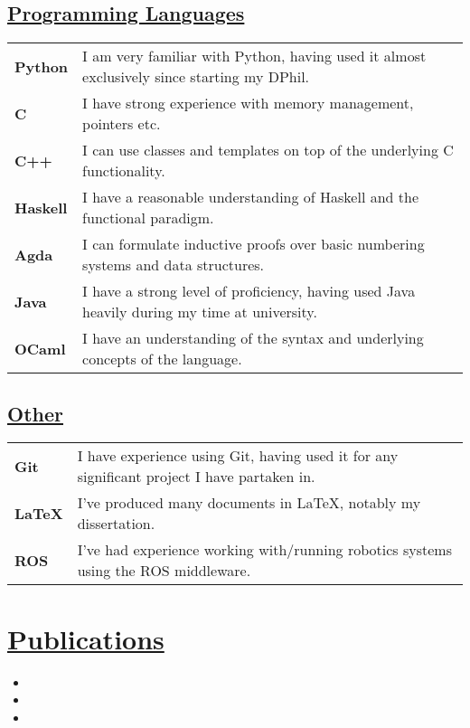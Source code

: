 \documentclass[11pt]{article}
\begin{document}
		\subsection*{\underline{Programming Languages}}
		\renewcommand{\arraystretch}{1.3}%
		\begin{tabular}[20pt]{ll}
		        \textbf{Python} & I am very familiar with Python, having used it almost exclusively since starting my DPhil. \\
			\textbf{C} & I have strong experience with memory management, pointers etc. \\
			\textbf{C++} & I can use classes and templates on top of the underlying C functionality. \\
			\textbf{Haskell} & I have a reasonable understanding of Haskell and the functional paradigm.\\
			\textbf{Agda} & I can formulate inductive proofs over basic numbering systems and data structures.\\
			 \textbf{Java} &  I have a strong level of proficiency, having used Java heavily during my time at university.\\
			 \textbf{OCaml} & I have an understanding of the syntax and underlying concepts of the language.\\
		\end{tabular} 
		\subsection*{\underline{Other}}
		\renewcommand{\arraystretch}{1.3}%
		\begin{tabular}{ll}
			 \textbf{Git} & I have experience using Git, having used it for any significant project I have partaken in.\\
			\textbf{LaTeX} & I've produced many documents in LaTeX, notably my dissertation.\\
			\textbf{ROS} & I've had experience working with/running robotics systems using the ROS middleware.
		\end{tabular}
\fi
			
\section*{\underline{Publications}}
\begin{itemize}
\item[\cite{street2022context}] 
\item[\cite{street2021congestion}] 	\item[\cite{street2020multi}] 
\end{itemize}
\end{document}
